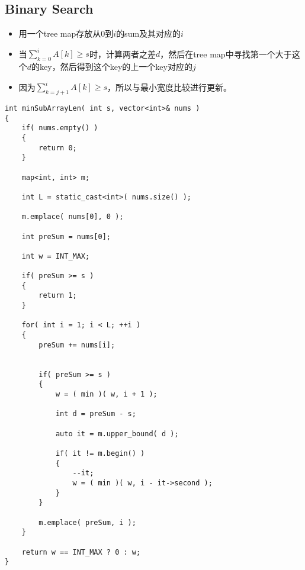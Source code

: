 \subsection{Binary Search}
\begin{CJK*}{UTF8}{gbsn}
\begin{itemize}
\item 用一个tree map存放从0到$i$的sum及其对应的$i$
\item 当$\sum\limits_{k=0}^iA[k] \geq s$时，计算两者之差$d$，然后在tree map中寻找第一个大于这个$d$的key，然后得到这个key的上一个key对应的$j$
\item 因为$\sum\limits_{k=j+1}^iA[k] \geq s$，所以与最小宽度比较进行更新。
\end{itemize}
\end{CJK*}
\begin{lstlisting}[style=customc, caption={Binary Search}]
int minSubArrayLen( int s, vector<int>& nums )
{
    if( nums.empty() )
    {
        return 0;
    }

    map<int, int> m;

    int L = static_cast<int>( nums.size() );

    m.emplace( nums[0], 0 );

    int preSum = nums[0];

    int w = INT_MAX;

    if( preSum >= s )
    {
        return 1;
    }

    for( int i = 1; i < L; ++i )
    {
        preSum += nums[i];


        if( preSum >= s )
        {
            w = ( min )( w, i + 1 );

            int d = preSum - s;

            auto it = m.upper_bound( d );

            if( it != m.begin() )
            {
                --it;
                w = ( min )( w, i - it->second );
            }
        }

        m.emplace( preSum, i );
    }

    return w == INT_MAX ? 0 : w;
}
\end{lstlisting}